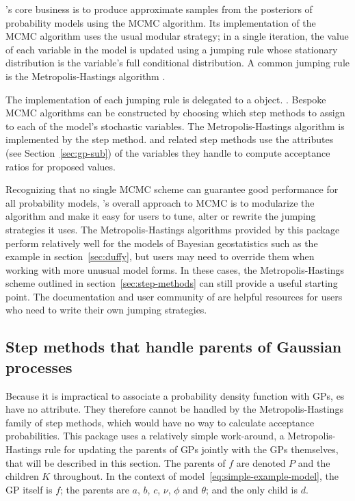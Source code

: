 \documentclass[article]{jss}
\begin{document}
's core business is to produce approximate samples from the posteriors of probability models using the MCMC algorithm. Its implementation of the MCMC algorithm uses the usual modular strategy; in a single iteration, the value of each variable in the model is updated using a jumping rule whose stationary distribution is the variable's full conditional distribution. A common jumping rule is the Metropolis-Hastings algorithm \citep{gamerman}. 

The implementation of each jumping rule is delegated to a  object. \citep{pymc}. Bespoke MCMC algorithms can be constructed by choosing which step methods to assign to each of the model's stochastic variables. The Metropolis-Hastings algorithm \citep{gamerman} is implemented by the  step method.  and related step methods use the  attributes (see Section~\ref{sec:gp-sub}) of the variables they handle to compute acceptance ratios for proposed values. 

\bigskip
Recognizing that no single MCMC scheme can guarantee good performance for all probability models, 's overall approach to MCMC is to modularize the algorithm and make it easy for users to tune, alter or rewrite the jumping strategies it uses. The Metropolis-Hastings algorithms provided by this package perform relatively well for the models of Bayesian geostatistics such as the example in section~\ref{sec:duffy}, but users may need to override them when working with more unusual model forms. In these cases, the Metropolis-Hastings scheme outlined in section~\ref{sec:step-methods} can still provide a useful starting point. The documentation and user community of  are helpful resources for users who need to write their own jumping strategies. 



\subsection{Step methods that handle parents of Gaussian processes}
Because it is impractical to associate a probability density function with GPs, es have no  attribute. They therefore cannot be handled by the Metropolis-Hastings family of step methods, which would have no way to calculate acceptance probabilities. This package uses a relatively simple work-around, a Metropolis-Hastings rule for updating the parents of GPs jointly with the GPs themselves, that will be described in this section. The parents of $f$ are denoted $P$ and the children $K$ throughout. In the context of model~\ref{eq:simple-example-model}, the GP itself is $f$; the parents are $a$, $b$, $c$, $\nu$, $\phi$ and $\theta$; and the only child is $d$.
\end{document}
